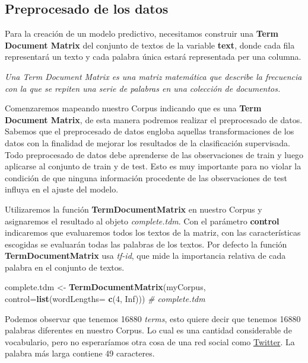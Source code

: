 \documentclass[
]{article}
\newenvironment{Shaded}{\begin{snugshade}}{\end{snugshade}}
\newcommand{\CommentTok}[1]{\textcolor[rgb]{0.56,0.35,0.01}{\textit{#1}}}
\newcommand{\DataTypeTok}[1]{\textcolor[rgb]{0.13,0.29,0.53}{#1}}
\newcommand{\DecValTok}[1]{\textcolor[rgb]{0.00,0.00,0.81}{#1}}
\newcommand{\KeywordTok}[1]{\textcolor[rgb]{0.13,0.29,0.53}{\textbf{#1}}}
\newcommand{\NormalTok}[1]{#1}
\newcommand{\OtherTok}[1]{\textcolor[rgb]{0.56,0.35,0.01}{#1}}
\newcommand{\StringTok}[1]{\textcolor[rgb]{0.31,0.60,0.02}{#1}}
\begin{document}
\hypertarget{preprocesado-de-los-datos}{%
\subsection{Preprocesado de los datos}\label{preprocesado-de-los-datos}}

Para la creación de un modelo predictivo, necesitamos construir una
\textbf{Term Document Matrix} del conjunto de textos de la variable
\textbf{text}, donde cada fila representará un texto y cada palabra
única estará representada per una columna.

\emph{Una Term Document Matrix es una matriz matemática que describe la
frecuencia con la que se repiten una serie de palabras en una colección
de documentos.}

Comenzaremos mapeando nuestro Corpus indicando que es una \textbf{Term
Document Matrix}, de esta manera podremos realizar el preprocesado de
datos. Sabemos que el preprocesado de datos engloba aquellas
transformaciones de los datos con la finalidad de mejorar los resultados
de la clasificación supervisada. Todo preprocesado de datos debe
aprenderse de las observaciones de train y luego aplicarse al conjunto
de train y de test. Esto es muy importante para no violar la condición
de que ninguna información procedente de las observaciones de test
influya en el ajuste del modelo.

Utilizaremos la función \textbf{TermDocumentMatrix} en nuestro Corpus y
asignaremos el resultado al objeto \emph{complete.tdm}. Con el parámetro
\textbf{control} indicaremos que evaluaremos todos los textos de la
matriz, con las características escogidas se evaluarán todas las
palabras de los textos. Por defecto la función
\textbf{TermDocumentMatrix} usa \emph{tf-id}, que mide la importancia
relativa de cada palabra en el conjunto de textos.

\begin{Shaded}
\begin{Highlighting}[]
\NormalTok{complete.tdm <-}\StringTok{ }\KeywordTok{TermDocumentMatrix}\NormalTok{(myCorpus, }\DataTypeTok{control=}\KeywordTok{list}\NormalTok{(}\DataTypeTok{wordLengths=} \KeywordTok{c}\NormalTok{(}\DecValTok{4}\NormalTok{, }\OtherTok{Inf}\NormalTok{)))}
\CommentTok{# complete.tdm}
\end{Highlighting}
\end{Shaded}

Podemos observar que tenemos 16880 \emph{terms}, esto quiere decir que
tenemos 16880 palabras diferentes en nuestro Corpus. Lo cual es una
cantidad considerable de vocabulario, pero no esperaríamos otra cosa de
una red social como \href{https://twitter.com}{Twitter}. La palabra más
larga contiene 49 caracteres.
\end{document}
